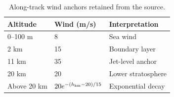 \begin{table}[htbp]
\caption{Along-track wind anchors retained from the source.}
\label{tab:src3}
\small
\setlength{\tabcolsep}{3.5pt}
\begin{tabularx}{\linewidth}{@{}lXX@{}}
\toprule
Altitude & Wind (m/s) & Interpretation \\
\midrule
0--100 m & 8 & Sea wind \\
2 km & 15 & Boundary layer \\
11 km & 35 & Jet-level anchor \\
20 km & 20 & Lower stratosphere \\
Above 20 km & $20e^{-(h_{\rm km}-20)/15}$ & Exponential decay \\
\bottomrule
\end{tabularx}
\end{table}
